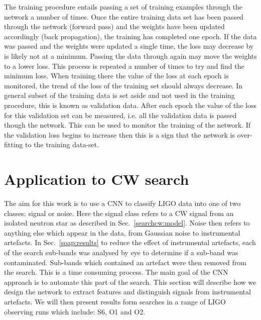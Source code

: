 The training procedure entails passing a set of training examples through the network a number of times. 
Once the entire training data set has been passed through the network (forward pass) and the weights have been updated accordingly (back propagation), the training has completed one epoch.
If the data was passed and the weights were updated a single time, the loss may decrease by is likely not at a minimum.
Passing the data through again may move the weights to a lower loss.
This process is repeated a number of times to try and find the minimum loss.
When training there the value of the loss at each epoch is monitored, the trend of the loss of the training set should always decrease. 
In general  subset of the training data is set aside and not used in the training procedure, this is known as validation data. 
After each epoch the value of the loss for this validation set can be measured, i.e. all the validation data is passed though the network. 
This can be used to monitor the training of the network. If the validation loss begins to increase then this is a sign that the network is over-fitting to the training data-set.


\section{\label{machine:cw}Application to CW search}

The aim for this work is to use a \gls{CNN} to classify \gls{LIGO} data into one of two classes: signal or noise.
Here the signal class refers to a \gls{CW} signal from an isolated neutron star as described in Sec.~\ref{searchcw:model}.
Noise then refers to anything else which appear in the data, from Gaussian noise to instrumental artefacts. 
In Sec.~\ref{soap:results} to reduce the effect of instrumental artefacts, each of the search sub-bands was analysed by eye to determine if a sub-band was contaminated. 
Sub-bands which contained an artefact were then removed from the search.
This is a time consuming process. The main goal of the \gls{CNN} approach is to automate this part of the search.
This section will describe how we design the network to extract features and distinguish signals from instrumental artefacts.
We will then present results form searches in a range of \gls{LIGO} observing runs which include: S6, O1 and O2.


